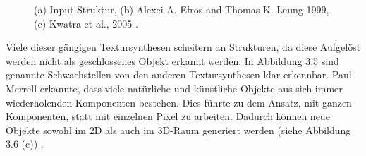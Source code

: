 \documentclass[12pt, a4paper,twoside,openany]{report} %
\begin{document}
\begin{figure}[H]
    \centering
    \qquad
    \qquad
    \caption{(a) Input Struktur, (b) Alexei A. Efros and Thomas K. Leung 1999, (c) Kwatra et al., 2005 \cite{merrell2009model}.}%
\end{figure}

Viele dieser gängigen Textursynthesen scheitern an Strukturen, da diese Aufgelöst werden nicht als geschlossenes Objekt erkannt werden.
In Abbildung 3.5 sind genannte Schwachstellen von den anderen Textursynthesen klar erkennbar.
\newline
Paul Merrell erkannte, dass viele natürliche und künstliche Objekte aus sich immer wiederholenden Komponenten bestehen.
Dies führte zu dem Ansatz, mit ganzen Komponenten, statt mit einzelnen Pixel zu arbeiten.
Dadurch können neue Objekte sowohl im 2D als auch im 3D-Raum generiert werden {(siehe Abbildung 3.6 (c))} \cite{merrell2009model}.
\end{document}
